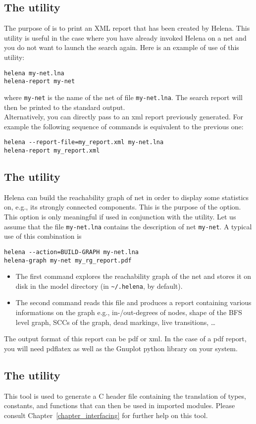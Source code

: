\subsection{The  utility}
The purpose of  is to print an XML report that
has been created by Helena.  This utility is useful in the case where
you have already invoked Helena on a net and you do not want to launch
the search again.  Here is an example of use of this utility:
\begin{verbatim}
helena my-net.lna
helena-report my-net
\end{verbatim}
where \texttt{my-net} is the name of the net of file \texttt{my-net.lna}.
The search report will then be printed to the standard output.\\
Alternatively, you can directly pass to  an
xml report previously generated.  For example the following sequence
of commands is equivalent to the previous one:
\begin{verbatim}
helena --report-file=my_report.xml my-net.lna
helena-report my_report.xml
\end{verbatim}
\subsection{The  utility}
\label{sec:helena-graph}
Helena can build the reachability graph of net in order to display
some statistics on, e.g., its strongly connected components.  This is
the purpose of the  option.  This option
is only meaningful if used in conjunction with the
 utility.  Let us assume that the file
\texttt{my-net.lna} contains the description of net \texttt{my-net}.
A typical use of this combination is
\begin{verbatim}
helena --action=BUILD-GRAPH my-net.lna
helena-graph my-net my_rg_report.pdf
\end{verbatim}
\begin{itemize}
\item The first command explores the reachability graph of the net and
  stores it on disk in the model directory (in \texttt{\~{}/.helena},
  by default).
\item The second command reads this file and produces a report
  containing various informations on the graph e.g., in-/out-degrees
  of nodes, shape of the BFS level graph, SCCs of the graph, dead
  markings, live transitions, \ldots
\end{itemize}
The output format of this report can be pdf or xml.  In the case of a
pdf report, you will need pdflatex as well as the Gnuplot python
library on your system.
\subsection{The  utility}
This tool is used to generate a C header file containing the
translation of types, constants, and functions that can then be used
in imported modules.  Please consult Chapter~\ref{chapter_interfacing}
for further help on this tool.
